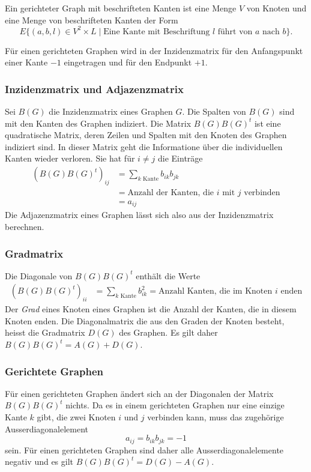 \begin{definition}
Ein gerichteter Graph mit beschrifteten Kanten ist eine Menge $V$ von 
Knoten und eine Menge von beschrifteten Kanten der Form
\[
E \{ (a,b,l)\in V^2\times L\;|\; \text{Eine Kante mit Beschriftung $l$ führt von $a$ nach $b$}\}.
\]
\end{definition}

Für einen gerichteten Graphen wird in der Inzidenzmatrix für
den Anfangspunkt einer Kante $-1$ eingetragen und für den
Endpunkt $+1$.

\subsubsection{Inzidenzmatrix und Adjazenzmatrix}
Sei $B(G)$ die Inzidenzmatrix eines Graphen $G$. 
Die Spalten von $B(G)$ sind mit den Kanten des Graphen indiziert.
Die Matrix $B(G)B(G)^t$ ist eine quadratische Matrix, deren
Zeilen und Spalten mit den Knoten des Graphen indiziert sind.
In dieser Matrix geht die Informatione über die individuellen
Kanten wieder verloren.
Sie hat für $i\ne j$ die Einträge
\begin{align*}
(B(G)B(G)^t)_{ij}
&=
\sum_{\text{$k$ Kante}} b_{ik}b_{jk}
\\
&=\text{Anzahl der Kanten, die $i$ mit $j$ verbinden}
\\
&=a_{ij}
\end{align*}
Die Adjazenzmatrix eines Graphen lässt sich also aus der
Inzidenzmatrix berechnen.

\subsubsection{Gradmatrix}
Die Diagonale von $B(G)B(G)^t$ enthält die Werte
\begin{align*}
(B(G)B(G)^t)_{ii}
&=
\sum_{\text{$k$ Kante}} b_{ik}^2
=
\text{Anzahl Kanten, die im Knoten $i$ enden}
\end{align*}
Der {\em Grad} eines Knoten eines Graphen ist die Anzahl der
%
Kanten, die in diesem Knoten enden.
Die Diagonalmatrix die aus den Graden der Knoten besteht, heisst die
Gradmatrix $D(G)$ des Graphen.
Es gilt daher $B(G)B(G)^t = A(G) + D(G)$.

\subsubsection{Gerichtete Graphen}
Für einen gerichteten Graphen ändert sich an der Diagonalen
der Matrix $B(G)B(G)^t$ nichts.
Da es in einem gerichteten Graphen nur eine einzige Kante $k$ gibt, die zwei
Knoten $i$ und $j$ verbinden kann, muss das zugehörige 
Ausserdiagonalelement
\[
a_{ij}
=b_{ik}b_{jk}
=
-1
\]
sein.
Für einen gerichteten Graphen sind daher alle Ausserdiagonalelemente
negativ und es gilt $B(G)B(G)^t = D(G)-A(G)$.

